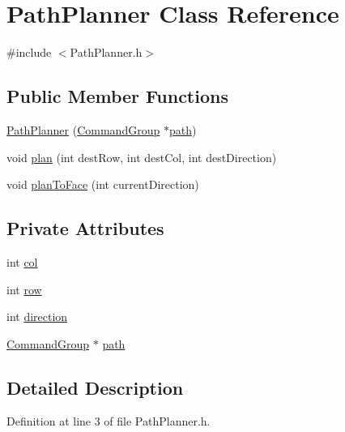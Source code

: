 \hypertarget{classPathPlanner}{\section{Path\-Planner Class Reference}
\label{classPathPlanner}
}


{\ttfamily \#include $<$Path\-Planner.\-h$>$}

\subsection*{Public Member Functions}
\begin{DoxyCompactItemize}
\item 
\hyperlink{classPathPlanner_a09453b54df73c22775e488a20d6a3e82}{Path\-Planner} (\hyperlink{classCommandGroup}{Command\-Group} $\ast$\hyperlink{classPathPlanner_a9b41e5ee68a78a45e46003102a6c3b91}{path})
\item 
void \hyperlink{classPathPlanner_a82f75ef3111891f20ba2c59f8b305d55}{plan} (int dest\-Row, int dest\-Col, int dest\-Direction)
\item 
void \hyperlink{classPathPlanner_a435470288f6e2b5f99ce590db0bfc5db}{plan\-To\-Face} (int current\-Direction)
\end{DoxyCompactItemize}
\subsection*{Private Attributes}
\begin{DoxyCompactItemize}
\item 
int \hyperlink{classPathPlanner_a20d2bf800c63aacfd1af314ad400d119}{col}
\item 
int \hyperlink{classPathPlanner_a00b0fa8525a5fe9c8088ccaa005c4c54}{row}
\item 
int \hyperlink{classPathPlanner_a1f9985b79ca49ca0b2992176a10a6210}{direction}
\item 
\hyperlink{classCommandGroup}{Command\-Group} $\ast$ \hyperlink{classPathPlanner_a9b41e5ee68a78a45e46003102a6c3b91}{path}
\end{DoxyCompactItemize}


\subsection{Detailed Description}


Definition at line 3 of file Path\-Planner.\-h.



